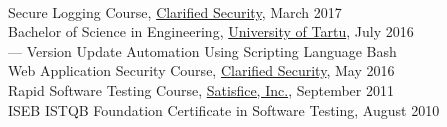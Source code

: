 \documentclass[a4paper, 12pt]{article}
\begin{document}
\\
Secure Logging Course, \href{https://clarifiedsecurity.com/secure-logging-training/}{Clarified Security}, {\footnotesize{March 2017}}\\
Bachelor of Science in Engineering, \href{https://www.ut.ee/en}{University of Tartu}, {\footnotesize{July 2016}}\\
\indent --- Version Update Automation Using Scripting Language Bash\\
Web Application Security Course, \href{https://www.clarifiedsecurity.com/web-application-security-training/}{Clarified Security}, {\footnotesize{May 2016}}\\
Rapid Software Testing Course, \href{http://www.satisfice.com/info_rst.shtml}{Satisfice, Inc.}, {\footnotesize{September 2011}}\\
ISEB ISTQB Foundation Certificate in Software Testing, {\footnotesize{August 2010}}\\

\pagestyle{empty}
\end{document}
